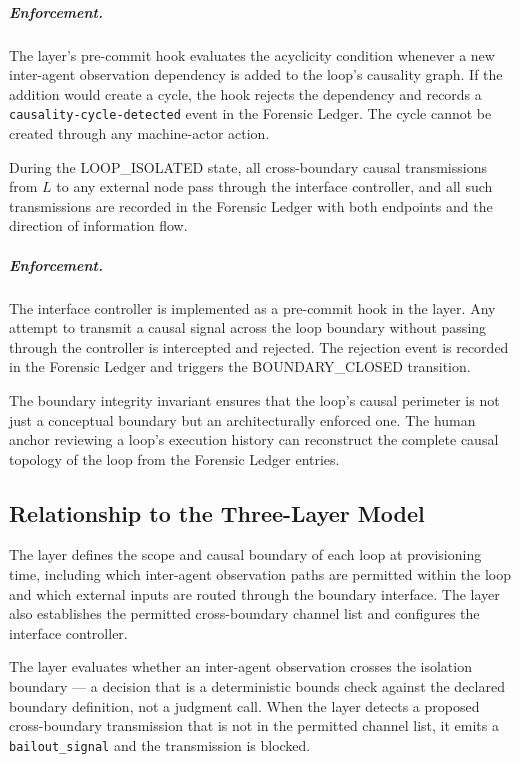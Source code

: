 \subparagraph{Enforcement.} The \fact{} layer's pre-commit hook evaluates the acyclicity condition whenever a new inter-agent observation dependency is added to the loop's causality graph. If the addition would create a cycle, the hook rejects the dependency and records a \texttt{causality-cycle-detected} event in the Forensic Ledger. The cycle cannot be created through any machine-actor action.

\begin{invariant}\label{inv:loop-boundary}
During the LOOP\_ISOLATED state, all cross-boundary causal transmissions from $L$ to any external node pass through the interface controller, and all such transmissions are recorded in the Forensic Ledger with both endpoints and the direction of information flow.
\end{invariant}

\subparagraph{Enforcement.} The interface controller is implemented as a pre-commit hook in the \fact{} layer. Any attempt to transmit a causal signal across the loop boundary without passing through the controller is intercepted and rejected. The rejection event is recorded in the Forensic Ledger and triggers the BOUNDARY\_CLOSED transition.

The boundary integrity invariant ensures that the loop's causal perimeter is not just a conceptual boundary but an architecturally enforced one. The human anchor reviewing a loop's execution history can reconstruct the complete causal topology of the loop from the Forensic Ledger entries.

\subsection{Relationship to the Three-Layer Model}\label{sec:loop-three-layer}

The \purpose{} layer defines the scope and causal boundary of each loop at provisioning time, including which inter-agent observation paths are permitted within the loop and which external inputs are routed through the boundary interface. The layer also establishes the permitted cross-boundary channel list and configures the interface controller.

The \bounds{} layer evaluates whether an inter-agent observation crosses the isolation boundary — a decision that is a deterministic bounds check against the declared boundary definition, not a judgment call. When the \bounds{} layer detects a proposed cross-boundary transmission that is not in the permitted channel list, it emits a \texttt{bailout\_signal} and the transmission is blocked.

